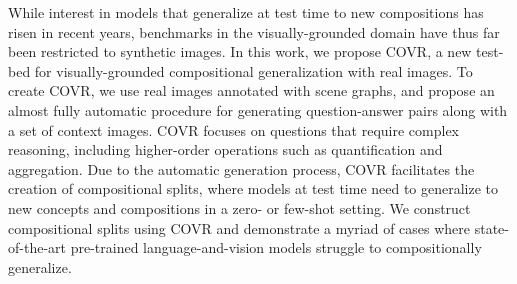 While interest in models that generalize at test time to new compositions has risen in recent years, benchmarks in the visually-grounded domain have thus far been restricted to synthetic images. In this work, we propose COVR, a new test-bed for visually-grounded compositional generalization with real images. To create COVR, we use real images annotated with scene graphs, and propose an almost fully automatic procedure for generating question-answer pairs along with a set of context images. COVR focuses on questions that require complex reasoning, including higher-order operations such as quantification and aggregation. Due to the automatic generation process, COVR facilitates the creation of compositional splits, where models at test time need to generalize to new concepts and compositions in a zero- or few-shot setting. We construct compositional splits using COVR and demonstrate a myriad of cases where state-of-the-art pre-trained language-and-vision models struggle to compositionally generalize.
